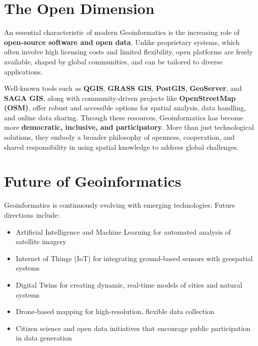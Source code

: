 \documentclass[
  11pt,
  letterpaper,
]{book}
\providecommand{\tightlist}{%
  \setlength{\itemsep}{0pt}\setlength{\parskip}{0pt}}
\begin{document}
\section{The Open Dimension}\label{the-open-dimension}

An essential characteristic of modern Geoinformatics is the increasing
role of \textbf{open-source software and open data}. Unlike proprietary
systems, which often involve high licensing costs and limited
flexibility, open platforms are freely available, shaped by global
communities, and can be tailored to diverse applications.

Well-known tools such as \textbf{QGIS}, \textbf{GRASS GIS},
\textbf{PostGIS}, \textbf{GeoServer}, and \textbf{SAGA GIS}, along with
community-driven projects like \textbf{OpenStreetMap (OSM)}, offer
robust and accessible options for spatial analysis, data handling, and
online data sharing. Through these resources, Geoinformatics has become
more \textbf{democratic, inclusive, and participatory}. More than just
technological solutions, they embody a broader philosophy of openness,
cooperation, and shared responsibility in using spatial knowledge to
address global challenges.

\section{Future of Geoinformatics}\label{future-of-geoinformatics}

Geoinformatics is continuously evolving with emerging technologies.
Future directions include:

\begin{itemize}
\tightlist
\item
  Artificial Intelligence and Machine Learning for automated analysis of
  satellite imagery\\
\item
  Internet of Things (IoT) for integrating ground-based sensors with
  geospatial systems\\
\item
  Digital Twins for creating dynamic, real-time models of cities and
  natural systems\\
\item
  Drone-based mapping for high-resolution, flexible data collection\\
\item
  Citizen science and open data initiatives that encourage public
  participation in data generation
\end{itemize}
\end{document}
